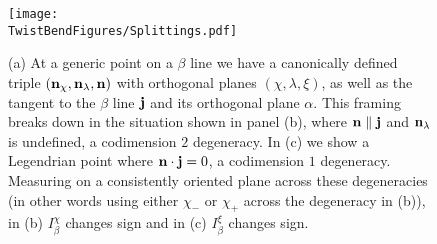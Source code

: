 \begin{figure}[htbp]
    \centering
    \texttt{[image: \\TwistBendFigures/Splittings.pdf]}
    \caption[A canonical framing of $\beta$ lines.]{(a) At a generic point on a $\beta$ line we have a canonically defined triple $(\mathbf{n}_\chi, \mathbf{n}_\lambda, \mathbf{n})$ with orthogonal planes $(\chi,\lambda, \xi)$, as well as the tangent to the $\beta$ line $\mathbf{j}$ and its orthogonal plane $\alpha$. This framing breaks down in the situation shown in panel (b), where  $\mathbf{n} \parallel \mathbf{j}$ and $\mathbf{n}_\lambda$ is undefined, a codimension $2$ degeneracy. In (c) we show a Legendrian point where $\mathbf{n} \cdot \mathbf{j} = 0$, a codimension $1$ degeneracy. Measuring on a consistently oriented plane across these degeneracies (in other words using either $\chi_-$ or $\chi_+$ across the degeneracy in (b)), in (b) $I^\chi_\beta$ changes sign and in (c) $I^\xi_\beta$ changes sign.}
    \label{fig:Splittings}
\end{figure}

